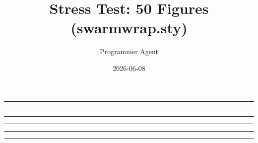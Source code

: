 \documentclass[a4paper,11pt]{article}
\title{Stress Test: 50 Figures (swarmwrap.sty)}
\author{Programmer Agent}
\date{2026-06-08}
\begin{document}
\maketitle


\begin{swarmwrap}%
  \begin{minipage}[t]{3cm}
    \centering
    \rule{\linewidth}{3cm}
  \end{minipage}%
\end{swarmwrap}%
\swarmwrapnext
\lipsum[1]

\begin{swarmwrap}%
  \begin{minipage}[t]{3cm}
    \centering
    \rule{\linewidth}{4cm}
  \end{minipage}%
\end{swarmwrap}%
\swarmwrapnext
\lipsum[1-2]

\begin{swarmwrap}%
  \begin{minipage}[t]{3cm}
    \centering
    \rule{\linewidth}{5cm}
  \end{minipage}%
\end{swarmwrap}%
\swarmwrapnext
\lipsum[1]

\begin{swarmwrap}%
  \begin{minipage}[t]{3cm}
    \centering
    \rule{\linewidth}{2cm}
  \end{minipage}%
\end{swarmwrap}%
\swarmwrapnext
\lipsum[1-3]

\begin{swarmwrap}%
  \begin{minipage}[t]{3cm}
    \centering
    \rule{\linewidth}{6cm}
  \end{minipage}%
\end{swarmwrap}%
\swarmwrapnext
\lipsum[1-2]

\begin{swarmwrap}%
  \begin{minipage}[t]{3cm}
    \centering
    \rule{\linewidth}{3cm}
  \end{minipage}%
\end{swarmwrap}%
\swarmwrapnext
\lipsum[1]
\end{document}
